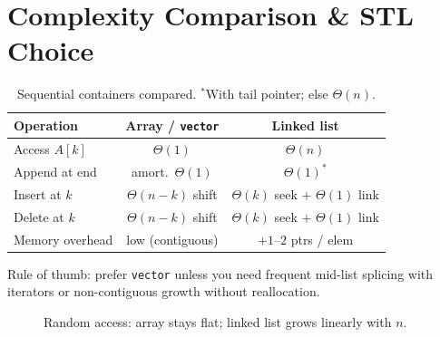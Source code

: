 \section{Complexity Comparison \& STL Choice}
\label{sec:comparison}

\begin{table}[h]
\centering
\small
\begin{tabular}{lcc}
\toprule
Operation & Array / \texttt{vector} & Linked list \\
\midrule
Access $A[k]$ & $\Theta(1)$ & $\Theta(n)$ \\
Append at end & amort.\ $\Theta(1)$ & $\Theta(1)^{*}$ \\
Insert at $k$ & $\Theta(n-k)$ shift & $\Theta(k)$ seek $+$ $\Theta(1)$ link \\
Delete at $k$ & $\Theta(n-k)$ shift & $\Theta(k)$ seek $+$ $\Theta(1)$ link \\
Memory overhead & low (contiguous) & $+1$--$2$ ptrs / elem \\
\bottomrule
\end{tabular}
\caption{Sequential containers compared. $^{*}$With tail pointer; else $\Theta(n)$.}
\label{tab:seq-compare}
\end{table}

Rule of thumb: prefer \texttt{vector} unless you need frequent mid-list splicing with iterators or non-contiguous growth without reallocation.

\begin{figure}[h]
\centering
{}
\caption{Random access: array stays flat; linked list grows linearly with $n$.}
\label{fig:access-cost}
\end{figure}



